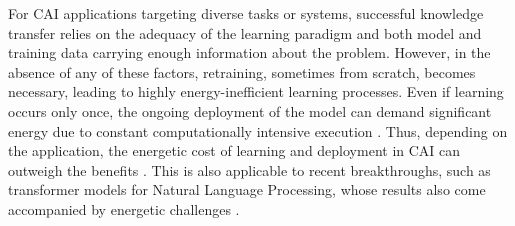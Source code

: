 \documentclass[12pt]{article}
\begin{document}
For CAI applications targeting diverse tasks or systems, successful knowledge transfer relies on the adequacy of the learning paradigm and both model and training data carrying enough information about the problem. However, in the absence of any of these factors, retraining, sometimes from scratch, becomes necessary, leading to highly energy-inefficient learning processes. Even if learning occurs only once, the ongoing deployment of the model can demand significant energy due to constant computationally intensive execution \cite{Vries2023growingenergyfootprint}. Thus, depending on the application, the energetic cost of learning and deployment in CAI can outweigh the benefits \cite{Strubell2019EnergyPolicyConsiderations}. This is also applicable to recent breakthroughs, such as transformer models for Natural Language Processing, whose results also come accompanied by energetic challenges \cite{Cao2020TowardsAccurateReliable}.
\end{document}

